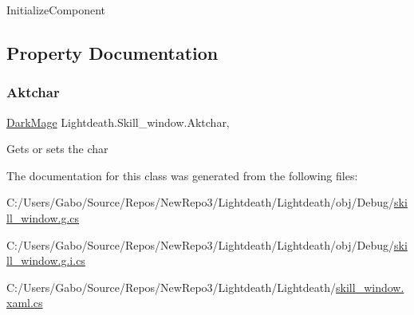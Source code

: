 Initialize\+Component 



\subsection{Property Documentation}
\hypertarget{class_lightdeath_1_1_skill__window_af9797b39af22bd8f22dd4173fda52808}{}\label{class_lightdeath_1_1_skill__window_af9797b39af22bd8f22dd4173fda52808} 
\subsubsection{\texorpdfstring{Aktchar}{Aktchar}}
{\footnotesize\ttfamily \hyperlink{class_lightdeath_1_1_dark_mage}{Dark\+Mage} Lightdeath.\+Skill\+\_\+window.\+Aktchar\hspace{0.3cm}{\ttfamily [get]}, {\ttfamily [set]}}



Gets or sets the char 



The documentation for this class was generated from the following files\+:\begin{DoxyCompactItemize}
\item 
C\+:/\+Users/\+Gabo/\+Source/\+Repos/\+New\+Repo3/\+Lightdeath/\+Lightdeath/obj/\+Debug/\hyperlink{skill__window_8g_8cs}{skill\+\_\+window.\+g.\+cs}\item 
C\+:/\+Users/\+Gabo/\+Source/\+Repos/\+New\+Repo3/\+Lightdeath/\+Lightdeath/obj/\+Debug/\hyperlink{skill__window_8g_8i_8cs}{skill\+\_\+window.\+g.\+i.\+cs}\item 
C\+:/\+Users/\+Gabo/\+Source/\+Repos/\+New\+Repo3/\+Lightdeath/\+Lightdeath/\hyperlink{skill__window_8xaml_8cs}{skill\+\_\+window.\+xaml.\+cs}\end{DoxyCompactItemize}
